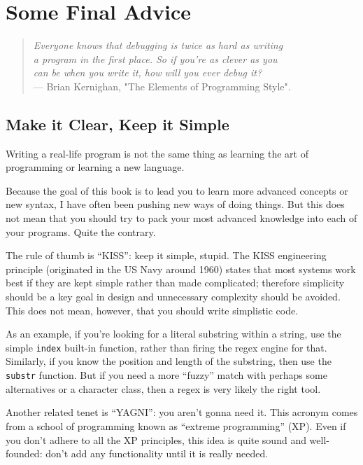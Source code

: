 \chapter{Some Final Advice}

\begin{quote}
\raggedleft 
\emph{Everyone knows that debugging is twice as hard as writing \\ 
a program in the first place. So if you're as clever as you \\
can be when you write it, how will you ever debug it? }\\
--- Brian Kernighan, "The Elements of Programming Style".
\end{quote}

\section{Make it Clear, Keep it Simple}

Writing a real-life program is not the same thing as learning 
the art of programming or learning a new language.

Because the goal of this book is to lead you to learn 
more advanced concepts or new syntax, I have often been 
pushing new ways of doing things. But this does not mean that 
you should try to pack your most advanced knowledge into 
each of your programs. Quite the contrary.

The rule of thumb is ``KISS'': keep it simple, stupid. The 
KISS engineering principle (originated in the US Navy 
around 1960) states that most systems work best if they 
are kept simple rather than made complicated; therefore 
simplicity should be a key goal in design and unnecessary 
complexity should be avoided. This does not mean, however, 
that you should write simplistic code.

As an example, if you're looking for a literal substring 
within a string, use the simple {\tt index} built-in function, 
rather than firing the regex engine for that. Similarly, 
if you know the position and length of the substring, then 
use the {\tt substr} function. But if you need a more ``fuzzy'' 
match with perhaps some alternatives or a character class, then 
a regex is very likely the right tool.

Another related tenet is ``YAGNI'': you aren't gonna need 
it. This acronym comes from a school of programming 
known as ``extreme programming'' (XP). Even if you don't 
adhere to all the XP principles, this idea is quite sound 
and well-founded: don't add any functionality until it is 
really needed.

